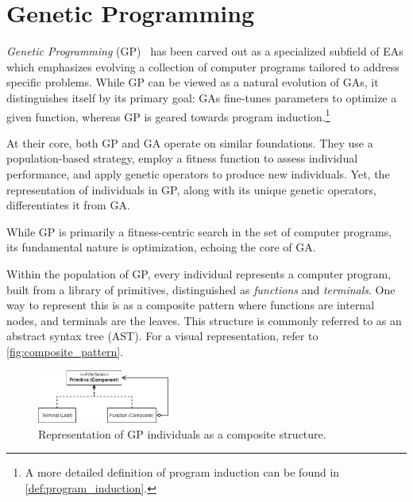 \section{Genetic Programming}
\label{sec:bg:gp}

  \emph{Genetic Programming} (GP)~\autocite{kozaGeneticProgrammingProgramming1992a,kozaGeneticProgrammingII1994,poliFieldGuideGenetic2008a,yuIntroductionEvolutionaryAlgorithms2010}
  has been carved out as a specialized subfield of EAs which emphasizes 
  evolving a collection of computer programs tailored to address specific 
  problems. While GP can be viewed as a natural evolution of 
  GAs, it distinguishes itself by its primary goal: GAs fine-tunes parameters 
  to optimize a given function, whereas GP is geared towards program induction.\footnote{%
    A more detailed definition of program induction can be found in \vref{def:program_induction}.
  }

  At their core, both GP and GA operate on similar foundations. They use a 
  population-based strategy, employ a fitness function to assess individual 
  performance, and apply genetic operators to produce new individuals. Yet, the 
  representation of individuals in GP, along with its unique genetic operators, 
  differentiates it from GA.

  \begin{remark}
    While GP is primarily a fitness-centric search in the set of computer 
    programs, its fundamental nature is optimization, echoing the core of GA.
  \end{remark}

  Within the population of GP, every individual represents a computer 
  program, built from a library of primitives, distinguished as 
  \emph{functions} and \emph{terminals}. One way to represent this is as a 
  composite pattern where functions are internal nodes, and terminals are the leaves. This structure is commonly referred to as an abstract syntax tree (AST). For a visual representation, refer to \vref{fig:composite_pattern}.

  \begin{figure}[ht!]
    \centering
    \includegraphics[width=0.4\textwidth]
      {img/theoretical_framework/GP Composite.png}
    \caption{
      Representation of GP individuals as a composite structure.
    }
    \label{fig:composite_pattern}
  \end{figure}

